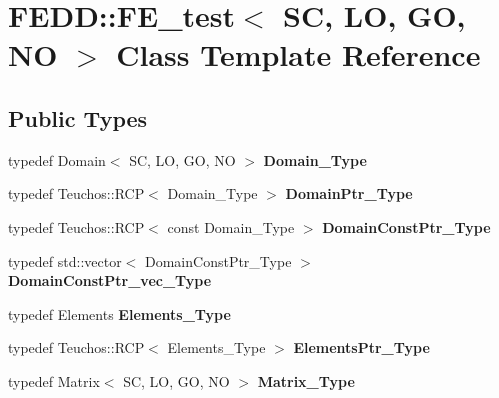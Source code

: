 \hypertarget{classFEDD_1_1FE__test}{}\section{F\+E\+DD\+:\+:F\+E\+\_\+test$<$ SC, LO, GO, NO $>$ Class Template Reference}
\label{classFEDD_1_1FE__test}
\subsection*{Public Types}
\begin{DoxyCompactItemize}
\item 
\mbox{\label{classFEDD_1_1FE__test_a4bf704b63e6a006c948788ac278fefdf}} 
typedef Domain$<$ SC, LO, GO, NO $>$ {\bfseries Domain\+\_\+\+Type}
\item 
\mbox{\label{classFEDD_1_1FE__test_a220cdfcf14adc7b10e3cf6b198c8ac1e}} 
typedef Teuchos\+::\+R\+CP$<$ Domain\+\_\+\+Type $>$ {\bfseries Domain\+Ptr\+\_\+\+Type}
\item 
\mbox{\label{classFEDD_1_1FE__test_a21352276864ccd9ed775284d09861b95}} 
typedef Teuchos\+::\+R\+CP$<$ const Domain\+\_\+\+Type $>$ {\bfseries Domain\+Const\+Ptr\+\_\+\+Type}
\item 
\mbox{\label{classFEDD_1_1FE__test_a93f3521d7bd37cfd52c784d6d6a53f8e}} 
typedef std\+::vector$<$ Domain\+Const\+Ptr\+\_\+\+Type $>$ {\bfseries Domain\+Const\+Ptr\+\_\+vec\+\_\+\+Type}
\item 
\mbox{\label{classFEDD_1_1FE__test_a0c33a401f8ef7e5686fbf10d7c977064}} 
typedef Elements {\bfseries Elements\+\_\+\+Type}
\item 
\mbox{\label{classFEDD_1_1FE__test_afe7ce4f08ca4b25a9af2ce5f0f9c4efa}} 
typedef Teuchos\+::\+R\+CP$<$ Elements\+\_\+\+Type $>$ {\bfseries Elements\+Ptr\+\_\+\+Type}
\item 
\mbox{\label{classFEDD_1_1FE__test_ad0cfe575f34823ebf02507cf9499757f}} 
typedef Matrix$<$ SC, LO, GO, NO $>$ {\bfseries Matrix\+\_\+\+Type}
\item 

\end{DoxyCompactItemize}
